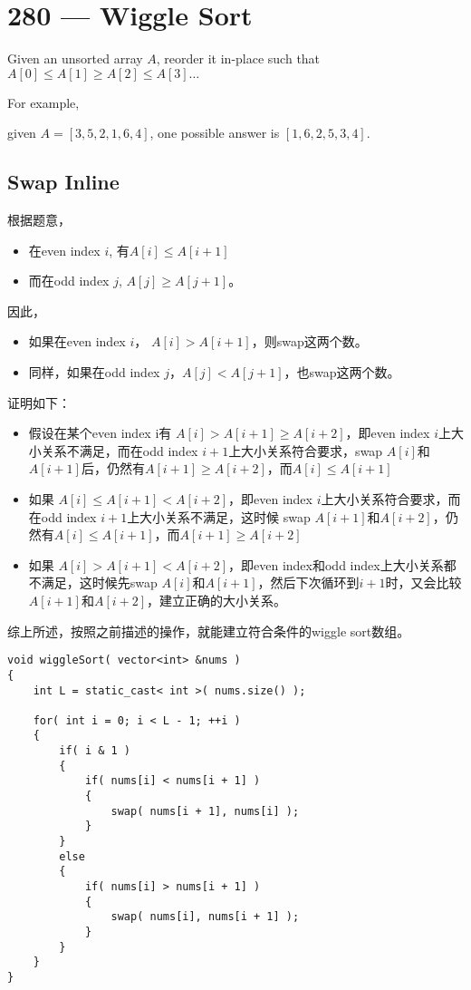  \section{280 --- Wiggle Sort}
Given an unsorted array $A$, reorder it in-place such that $A[0] \leq A[1] \geq A[2] \leq A[3] \ldots$
\par
For example, 
\par
given $A = [3, 5, 2, 1, 6, 4]$, one possible answer is $[1, 6, 2, 5, 3, 4]$.
\subsection{Swap Inline}
根据题意，
\begin{itemize}
    \item 在even index $i$, 有$A[i]\leq A[i+1]$
    \item 而在odd index $j$, $A[j]\geq A[j+1]$。
\end{itemize}
因此，
\begin{itemize}
    \item 如果在even index $i$， $A[i]> A[i+1]$，则swap这两个数。
    \item 同样，如果在odd index $j$，$A[j]< A[j+1]$，也swap这两个数。
\end{itemize}
证明如下：
\begin{itemize}
    \item 假设在某个even index i有
$A[i]>A[i+1]\geq A[i+2]$，即even index $i$上大小关系不满足，而在odd index $i+1$上大小关系符合要求，swap $A[i]$和$A[i+1]$后，仍然有$A[i+1] \geq A[i+2]$，而$A[i]\leq A[i+1]$
\item 如果
$A[i]\leq A[i+1]<A[i+2]$，即even index $i$上大小关系符合要求，而在odd index $i+1$上大小关系不满足，这时候
swap $A[i+1]$和$A[i+2]$，仍然有$A[i]\leq A[i+1]$，而$A[i+1]\geq A[i+2]$
\item 如果
$A[i]>A[i+1]<A[i+2]$，即even index和odd index上大小关系都不满足，这时候先swap $A[i]$和$A[i+1]$，然后下次循环到$i+1$时，又会比较$A[i+1]$和$A[i+2]$，建立正确的大小关系。
\end{itemize}
综上所述，按照之前描述的操作，就能建立符合条件的wiggle sort数组。

\setcounter{lstlisting}{0}
\begin{lstlisting}[style=customc, caption={Swap Inline}]
void wiggleSort( vector<int> &nums )
{
    int L = static_cast< int >( nums.size() );

    for( int i = 0; i < L - 1; ++i )
    {
        if( i & 1 )
        {
            if( nums[i] < nums[i + 1] )
            {
                swap( nums[i + 1], nums[i] );
            }
        }
        else
        {
            if( nums[i] > nums[i + 1] )
            {
                swap( nums[i], nums[i + 1] );
            }
        }
    }
}
\end{lstlisting}